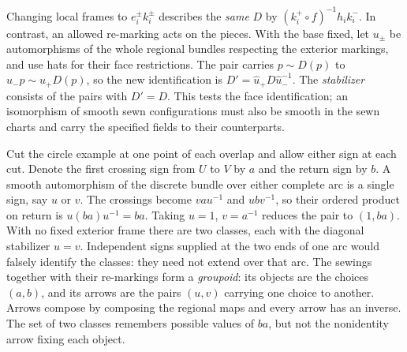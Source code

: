 Changing local frames to $e_i^\pm k_i^\pm$ describes the \emph{same} $D$ by $(k_i^+\circ f)^{-1}h_i k_i^-$. In contrast, an allowed re-marking acts on the pieces. With the base fixed, let $u_\pm$ be automorphisms of the whole regional bundles respecting the exterior markings, and use hats for their face restrictions. The pair carries $p\sim D(p)$ to $u_-p\sim u_+D(p)$, so the new identification is $D'=\widehat u_+D\widehat u_-^{-1}$. The \emph{stabilizer} consists of the pairs with $D'=D$. This tests the face identification; an isomorphism of smooth sewn configurations must also be smooth in the sewn charts and carry the specified fields to their counterparts.

Cut the circle example at one point of each overlap and allow either sign at each cut. Denote the first crossing sign from $U$ to $V$ by $a$ and the return sign by $b$. A smooth automorphism of the discrete bundle over either complete arc is a single sign, say $u$ or $v$. The crossings become $vau^{-1}$ and $ubv^{-1}$, so their ordered product on return is $u(ba)u^{-1}=ba$. Taking $u=1$, $v=a^{-1}$ reduces the pair to $(1,ba)$. With no fixed exterior frame there are two classes, each with the diagonal stabilizer $u=v$. Independent signs supplied at the two ends of one arc would falsely identify the classes: they need not extend over that arc. The sewings together with their re-markings form a \emph{groupoid}: its objects are the choices $(a,b)$, and its arrows are the pairs $(u,v)$ carrying one choice to another. Arrows compose by composing the regional maps and every arrow has an inverse. The set of two classes remembers possible values of $ba$, but not the nonidentity arrow fixing each object.

